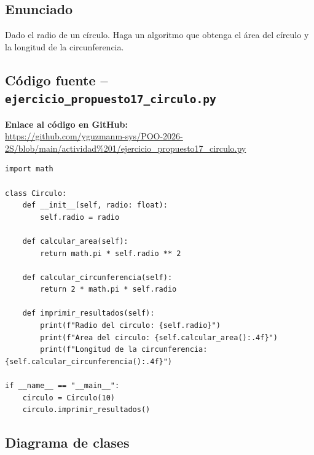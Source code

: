 \documentclass[12pt,a4paper]{article}
\begin{document}
\subsection{Enunciado}
Dado el radio de un c\'irculo. Haga un algoritmo que obtenga el \'area del c\'irculo y la longitud de la circunferencia.

\subsection{C\'odigo fuente -- \texttt{ejercicio\_propuesto17\_circulo.py}}
\noindent \textbf{Enlace al c\'odigo en GitHub:}\\
\url{https://github.com/yguzmanm-sys/POO-2026-2S/blob/main/actividad%201/ejercicio_propuesto17_circulo.py}\\[0.3cm]

\begin{lstlisting}[style=pythonstyle, caption={C\'irculo -- ejercicio\_propuesto17\_circulo.py}]
import math

class Circulo:
    def __init__(self, radio: float):
        self.radio = radio

    def calcular_area(self):
        return math.pi * self.radio ** 2

    def calcular_circunferencia(self):
        return 2 * math.pi * self.radio

    def imprimir_resultados(self):
        print(f"Radio del circulo: {self.radio}")
        print(f"Area del circulo: {self.calcular_area():.4f}")
        print(f"Longitud de la circunferencia: {self.calcular_circunferencia():.4f}")

if __name__ == "__main__":
    circulo = Circulo(10)
    circulo.imprimir_resultados()
\end{lstlisting}

\subsection{Diagrama de clases}
\end{document}
